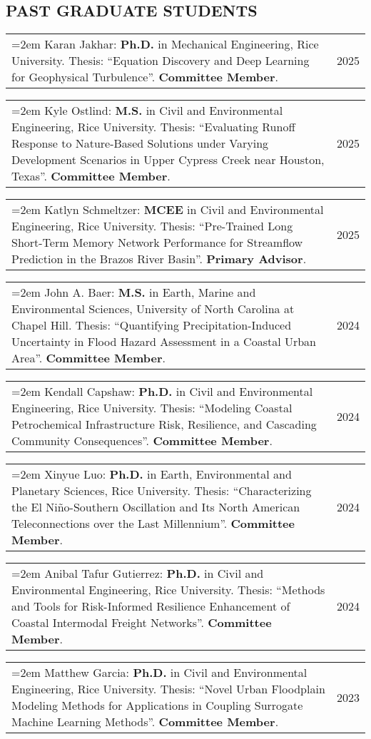 \documentclass[10pt,oneside]{article}
\makeatletter
\newenvironment{alignedentrieshang}[1][2em]{%
  \noindent%
}{%
}
\newcommand{\hangingitem}[2]{%
  \noindent%
  \begin{tabular*}{\textwidth}{@{}p{0.85\textwidth}@{\extracolsep{\fill}}r@{}}%
    \hangindent=2em \hangafter=1 #1 & #2%
  \end{tabular*}%
}
\makeatother
\begin{document}
\subsection{PAST GRADUATE STUDENTS}

\begin{alignedentrieshang}

\hangingitem{Karan Jakhar: \textbf{Ph.D.} in Mechanical Engineering, Rice University. Thesis: \enquote{Equation Discovery and Deep Learning for Geophysical Turbulence}. \textbf{Committee Member}.}{2025}

\hangingitem{Kyle Ostlind: \textbf{M.S.} in Civil and Environmental Engineering, Rice University. Thesis: \enquote{Evaluating Runoff Response to Nature-Based Solutions under Varying Development Scenarios in Upper Cypress Creek near Houston, Texas}. \textbf{Committee Member}.}{2025}

\hangingitem{Katlyn Schmeltzer: \textbf{MCEE} in Civil and Environmental Engineering, Rice University. Thesis: \enquote{Pre-Trained Long Short-Term Memory Network Performance for Streamflow Prediction in the Brazos River Basin}. \textbf{Primary Advisor}.}{2025}

\hangingitem{John A. Baer: \textbf{M.S.} in Earth, Marine and Environmental Sciences, University of North Carolina at Chapel Hill. Thesis: \enquote{Quantifying Precipitation-Induced Uncertainty in Flood Hazard Assessment in a Coastal Urban Area}. \textbf{Committee Member}.}{2024}

\hangingitem{Kendall Capshaw: \textbf{Ph.D.} in Civil and Environmental Engineering, Rice University. Thesis: \enquote{Modeling Coastal Petrochemical Infrastructure Risk, Resilience, and Cascading Community Consequences}. \textbf{Committee Member}.}{2024}

\hangingitem{Xinyue Luo: \textbf{Ph.D.} in Earth, Environmental and Planetary Sciences, Rice University. Thesis: \enquote{Characterizing the El Niño-Southern Oscillation and Its North American Teleconnections over the Last Millennium}. \textbf{Committee Member}.}{2024}

\hangingitem{Anibal Tafur Gutierrez: \textbf{Ph.D.} in Civil and Environmental Engineering, Rice University. Thesis: \enquote{Methods and Tools for Risk-Informed Resilience Enhancement of Coastal Intermodal Freight Networks}. \textbf{Committee Member}.}{2024}

\hangingitem{Matthew Garcia: \textbf{Ph.D.} in Civil and Environmental Engineering, Rice University. Thesis: \enquote{Novel Urban Floodplain Modeling Methods for Applications in Coupling Surrogate Machine Learning Methods}. \textbf{Committee Member}.}{2023}


\end{alignedentrieshang}
\end{document}
